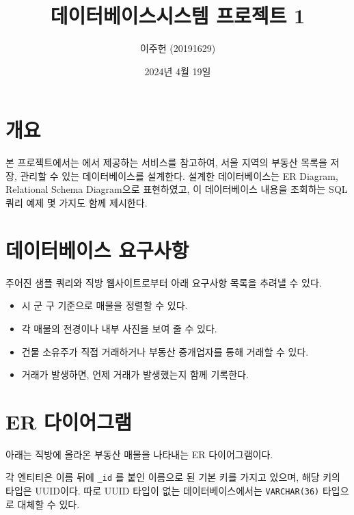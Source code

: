 \documentclass{article}
\title{데이터베이스시스템 프로젝트 1}
\author{이주헌 (20191629)}
\date{2024년 4월 19일}
\newcommand\code[1]{
  \texttt{\large{#1}}
}
\begin{document}
\maketitle
\newpage

\section{개요}

본 프로젝트에서는 에서 제공하는 서비스를 참고하여, 서울 지역의 부동산 목록을 저장, 관리할 수 있는 데이터베이스를 설계한다.
설계한 데이터베이스는 ER Diagram, Relational Schema Diagram으로 표현하였고, 이 데이터베이스 내용을 조회하는 SQL 쿼리 예제 몇 가지도 함께 제시한다.

\section{데이터베이스 요구사항}

주어진 샘플 쿼리와 직방 웹사이트로부터 아래 요구사항 목록을 추려낼 수 있다.

\begin{itemize}
\item 시 \cdot 군 \cdot 구 기준으로 매물을 정렬할 수 있다.
\item 각 매물의 전경이나 내부 사진을 보여 줄 수 있다.
\item 건물 소유주가 직접 거래하거나 부동산 중개업자를 통해 거래할 수 있다.
\item 거래가 발생하면, 언제 거래가 발생했는지 함께 기록한다.
\end{itemize}

\section{ER 다이어그램}

아래는 직방에 올라온 부동산 매물을 나타내는 ER 다이어그램이다.

각 엔티티은 이름 뒤에 \code{\_id}를 붙인 이름으로 된 기본 키를 가지고 있으며, 해당 키의 타입은 UUID이다.
따로 UUID 타입이 없는 데이터베이스에서는 \code{VARCHAR(36)} 타입으로 대체할 수 있다.
\end{document}
